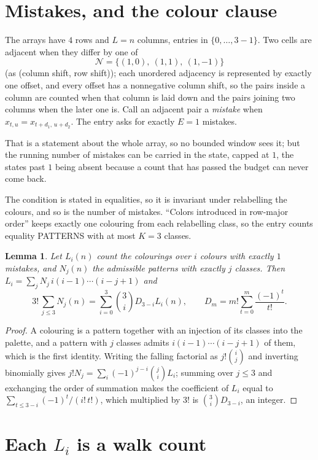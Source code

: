 \documentclass[11pt,a4paper]{article}
\theoremstyle{plain}
\newtheorem{lemma}[theorem]{Lemma}
\theoremstyle{definition}
\begin{document}
\section{Mistakes, and the colour clause}

The arrays have $4$ rows and $L=n$ columns, entries in $\{0,\dots,3-1\}$.
Two cells are adjacent when they differ by one of
\[
\mathcal N=\{(1,0),\ (1,1),\ (1,-1)\}
\]
(as (column shift, row shift)); each unordered adjacency is represented by exactly one
offset, and every offset has a nonnegative column shift, so the pairs inside a column are
counted when that column is laid down and the pairs joining two columns when the later one
is. Call an adjacent pair a \emph{mistake} when $x_{t,u}=x_{t+d_1,\,u+d_2}$. The entry asks for exactly
$E=1$ mistakes.

That is a statement about the whole array, so no bounded window sees it; but the running
number of mistakes can be carried in the state, capped at $1$, the states past $1$ being
absent because a count that has passed the budget can never come back.

The condition is stated in equalities, so it is invariant under relabelling the colours, and
so is the number of mistakes. ``Colors introduced in row-major order'' keeps exactly one
colouring from each relabelling class, so the entry counts equality PATTERNS with at most
$K=3$ classes.

\begin{lemma}\label{lem:inv}
Let $L_i(n)$ count the colourings over $i$ colours with exactly $1$ mistakes, and $N_j(n)$
the admissible patterns with exactly $j$ classes. Then
$L_i=\sum_j N_j\,i(i-1)\cdots(i-j+1)$ and
\[
3!\,\sum_{j\le3}N_j(n)=\sum_{i=0}^{3}\binom{3}{i}D_{3-i}L_i(n),
\qquad D_m=m!\sum_{t=0}^{m}\frac{(-1)^t}{t!} .
\]
\end{lemma}

\begin{proof}
A colouring is a pattern together with an injection of its classes into the palette, and a
pattern with $j$ classes admits $i(i-1)\cdots(i-j+1)$ of them, which is the first identity.
Writing the falling factorial as $j!\binom{i}{j}$ and inverting binomially gives
$j!N_j=\sum_i(-1)^{j-i}\binom{j}{i}L_i$; summing over $j\le3$ and exchanging the order
of summation makes the coefficient of $L_i$ equal to $\sum_{t\le3-i}(-1)^t/(i!\,t!)$,
which multiplied by $3!$ is $\binom{3}{i}D_{3-i}$, an integer.
\end{proof}

\section{Each $L_i$ is a walk count}
\end{document}
